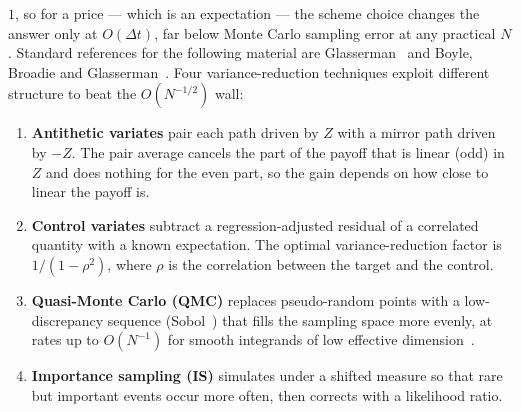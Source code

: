 \documentclass[sigconf]{acmart}
\begin{document}
$1$, so for a price --- which is an expectation --- the scheme choice changes
the answer only at $O(\Delta t)$, far below Monte Carlo sampling error at any
practical $N$. Standard references for the following material are
Glasserman~\cite{Glasserman2004} and Boyle, Broadie and
Glasserman~\cite{BoyleBroadieGlasserman1997}. Four variance-reduction
techniques exploit different structure to beat the $O(N^{-1/2})$ wall:
\begin{enumerate}
  \item \textbf{Antithetic variates} pair each path driven by $Z$ with a
    mirror path driven by $-Z$. The pair average cancels the part of the
    payoff that is linear (odd) in $Z$ and does nothing for the even part, so
    the gain depends on how close to linear the payoff is.
  \item \textbf{Control variates} subtract a regression-adjusted residual of
    a correlated quantity with a known expectation. The optimal
    variance-reduction factor is $1/(1-\rho^2)$, where $\rho$ is the
    correlation between the target and the control.
  \item \textbf{Quasi-Monte Carlo (QMC)} replaces pseudo-random points with a
    low-discrepancy sequence (Sobol~\cite{Sobol1967,JoeKuo2008}) that fills
    the sampling space more evenly, at rates up to $O(N^{-1})$ for smooth
    integrands of low effective
    dimension~\cite{MoskowitzCaflisch1996,BoyleBroadieGlasserman1997}.
  \item \textbf{Importance sampling (IS)} simulates under a shifted measure
    so that rare but important events occur more often, then corrects with a
    likelihood ratio.
\end{enumerate}
\end{document}
